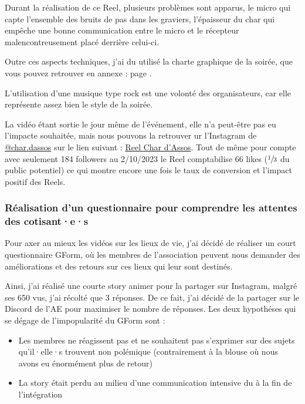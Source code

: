Durant la réalisation de ce Reel, plusieurs problèmes sont apparus, le micro qui capte l'ensemble des bruits de pas dans les graviers, l'épaisseur du char qui empêche une bonne communication entre le micro et le récepteur malencontreusement placé derrière celui-ci.

Outre ces aspects techniques, j'ai du utilisé la charte graphique de la soirée, que vous pouvez retrouver en annexe : page \pageref{subsec:charte-char-dassos}.

L'utilisation d'une musique type rock est une volonté des organisateurs, car elle représente assez bien le style de la soirée.

La vidéo étant sortie le jour même de l'événement, elle n'a peut-être pas eu l'impacte souhaitée, mais nous pouvons la retrouver ur l'Instagram de \href{https://www.instagram.com/char.dassos/}{@char.dassos} sur le lien suivant : \href{https://www.instagram.com/reel/Cxuj5g2MKov/?utm_source=ig_web_button_share_sheet&igshid=MzRlODBiNWFlZA==}{Reel Char d'Assos}.
Tout de même pour compte avec seulement 184 followers au 2/10/2023 le Reel comptabilise 66 likes ($\sfrac{1}{3}$ du public potentiel) ce qui montre encore une fois le taux de conversion et l'impact positif des Reels.

\subsubsection{Réalisation d'un questionnaire pour comprendre les attentes des cotisant·e·s}

Pour axer au mieux les vidéos sur les lieux de vie, j'ai décidé de réaliser un court questionnaire GForm, où les membres de l'association peuvent nous demander des améliorations et des retours sur ces lieux qui leur sont destinés.

Ainsi, j'ai réalisé une courte story animer pour la partager sur Instagram, malgré ses 650 vus, j'ai récolté que 3 réponses.
De ce fait, j'ai décidé de la partager sur le Discord de l'\gls{AE} pour maximiser le nombre de réponses.
Les deux hypothéses qui se dégage de l'impopularité du GForm sont :
\begin{itemize}
    \item Les membres ne réagissent pas et ne souhaitent pas s'exprimer sur des sujets qu'il·elle·s trouvent non polémique (contrairement à la blouse où nous avons eu énormément plus de retour)
    \item La story était perdu au milieu d'une communication intensive du à la fin de l'intégration
\end{itemize}


